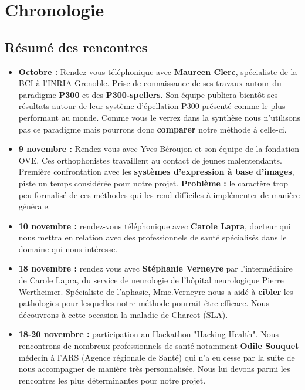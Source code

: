 \documentclass[12pt]{article}
\begin{document}
\section{Chronologie}
	\subsection{Résumé des rencontres}
	
	\begin{itemize}
		\item \textbf{Octobre : } Rendez vous téléphonique avec \textbf{Maureen Clerc}, spécialiste de la BCI à l'INRIA Grenoble. Prise de connaissance de ses travaux autour du paradigme \textbf{P300} et des \textbf{P300-spellers}. Son équipe publiera bientôt ses résultats autour de leur système d'épellation P300 présenté comme le plus performant au monde. Comme vous le verrez dans la synthèse nous n'utilisons pas ce paradigme mais pourrons donc \textbf{comparer} notre méthode à celle-ci. \\
		\item \textbf{9 novembre : } Rendez vous avec Yves Béroujon et son équipe de la fondation OVE. Ces orthophonistes travaillent au contact de jeunes malentendants. Première confrontation avec les \textbf{systèmes d'expression à base d'images}, piste un temps considérée pour notre projet.  \textbf{Problème :} le caractère trop peu formalisé de ces méthodes qui les rend difficiles à implémenter de manière générale. \\
		\item \textbf{10 novembre : } rendez-vous téléphonique avec \textbf{Carole Lapra}, docteur qui nous mettra en relation avec des professionnels de santé spécialisés dans le domaine qui nous intéresse. \\
		\item \textbf{18 novembre : } rendez vous avec \textbf{Stéphanie Verneyre} par l'intermédiaire de Carole Lapra, du service de neurologie de l'hôpital neurologique Pierre Wertheimer. Spécialiste de l'aphasie, Mme.Verneyre nous a aidé à \textbf{cibler} les pathologies pour lesquelles notre méthode pourrait être efficace. Nous découvrons à cette occasion la maladie de Charcot (SLA). \\
		\item \textbf{18-20 novembre : } participation au Hackathon "Hacking Health". Nous rencontrons de nombreux professionnels de santé notamment \textbf{Odile Souquet} médecin à l'ARS (Agence régionale de Santé) qui n'a eu cesse par la suite de nous accompagner de manière très personnalisée. Nous lui devons parmi les rencontres les plus déterminantes pour notre projet. \\

\end{itemize}
\end{document}
